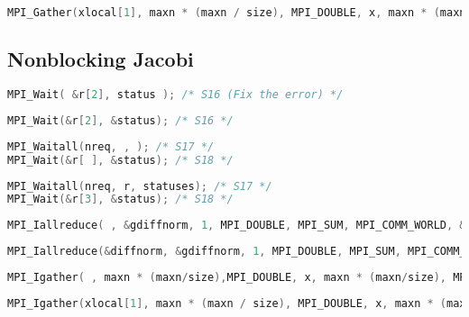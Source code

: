 \documentclass[a4paper, 10pt]{article}
\begin{document}
    \begin{lstlisting}[language=c, caption={Correct }]
MPI_Gather(xlocal[1], maxn * (maxn / size), MPI_DOUBLE, x, maxn * (maxn / size), MPI_DOUBLE, 0, MPI_COMM_WORLD); /* S15 */

    \end{lstlisting}

\subsection{Nonblocking Jacobi}
    \begin{lstlisting}[language=c, caption={Template S16}]
MPI_Wait( &r[2], status ); /* S16 (Fix the error) */
    \end{lstlisting}

    \begin{lstlisting}[language=c, caption={Correct S16}]
MPI_Wait(&r[2], &status); /* S16 */
    \end{lstlisting}

    \begin{lstlisting}[language=c, caption={Template S17, S18}]
MPI_Waitall(nreq, , ); /* S17 */
MPI_Wait(&r[ ], &status); /* S18 */
    \end{lstlisting}

    \begin{lstlisting}[language=c, caption={Correct S17, S18}]
MPI_Waitall(nreq, r, statuses); /* S17 */
MPI_Wait(&r[3], &status); /* S18 */
    \end{lstlisting}

    \begin{lstlisting}[language=c, caption={Template S19}]
MPI_Iallreduce( , &gdiffnorm, 1, MPI_DOUBLE, MPI_SUM, MPI_COMM_WORLD, &r[ ]); /* S19 */
    \end{lstlisting}

    \begin{lstlisting}[language=c, caption={Correct S19}]
MPI_Iallreduce(&diffnorm, &gdiffnorm, 1, MPI_DOUBLE, MPI_SUM, MPI_COMM_WORLD, &r[0]); /* S19 */
    \end{lstlisting}

    \begin{lstlisting}[language=c, caption={Template 20}]
MPI_Igather( , maxn * (maxn/size),MPI_DOUBLE, x, maxn * (maxn/size), MPI_DOUBLE, 0, MPI_COMM_WORLD, &r[ ]); /* S20 */
    \end{lstlisting}

    \begin{lstlisting}[language=c, caption={Correct 20}]
MPI_Igather(xlocal[1], maxn * (maxn / size), MPI_DOUBLE, x, maxn * (maxn / size), MPI_DOUBLE, 0, MPI_COMM_WORLD, &r[0]); /* S20 */
    \end{lstlisting}
\end{document}
